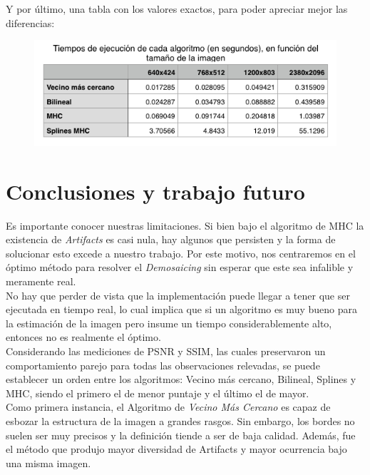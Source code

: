 \documentclass[a4paper]{article}
\begin{document}
Y por último, una tabla con los valores exactos, para poder apreciar mejor las diferencias:
\begin{figure}[h!]
    \begin{center}
    \includegraphics[scale=0.70]{imagenes/tiempos/todost.png}
    \label{tiempos3}
  \end{center}
\end{figure}

\newpage
\section{Conclusiones y trabajo futuro}



Es importante conocer nuestras limitaciones. Si bien bajo el algoritmo de MHC la existencia de \emph{Artifacts} es casi nula, hay algunos que persisten y la forma de solucionar esto excede a nuestro trabajo. Por este motivo, nos centraremos en el \'optimo m\'etodo para resolver el \emph{Demosaicing} sin esperar que este sea infalible y meramente real.\\

No hay que perder de vista que la implementación puede llegar a tener que ser ejecutada en tiempo real, lo cual implica que si un algoritmo es muy bueno para la estimaci\'on de la imagen pero insume un tiempo considerablemente alto, entonces no es realmente el óptimo.\\

Considerando las mediciones de PSNR y SSIM, las cuales preservaron un comportamiento parejo para todas las observaciones relevadas, se puede establecer un orden entre los algoritmos: Vecino m\'as cercano, Bilineal, Splines y MHC, siendo el primero el de menor puntaje y el \'ultimo el de mayor.\\

Como primera instancia, el Algoritmo de\textit{ Vecino M\'as Cercano} es capaz de esbozar la estructura de la imagen a grandes rasgos. Sin embargo, los bordes no suelen ser muy precisos y la definici\'on tiende a ser de baja calidad.  Además, fue el método que produjo mayor diversidad de Artifacts y mayor ocurrencia bajo una misma imagen.
\end{document}
